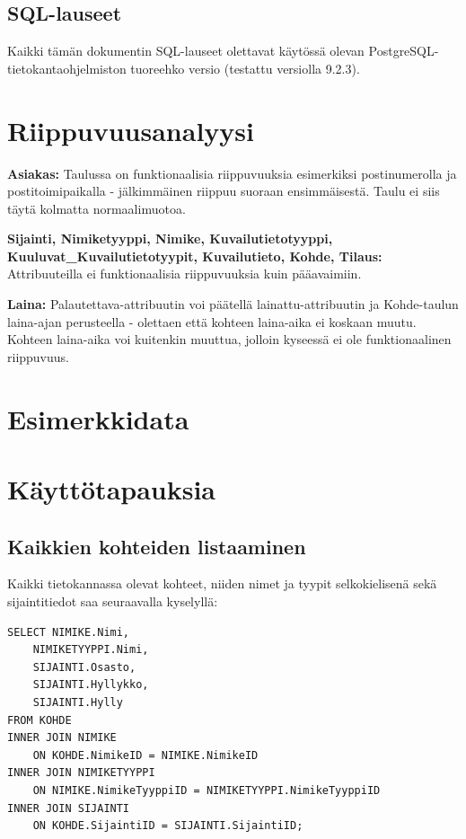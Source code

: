 \documentclass{article}
\let\stdsection\section
\renewcommand\section{\newpage\stdsection}
\begin{document}
\subsection{SQL-lauseet}

Kaikki tämän dokumentin SQL-lauseet olettavat käytössä olevan PostgreSQL-tietokantaohjelmiston tuoreehko versio (testattu versiolla 9.2.3).



\section{Riippuvuusanalyysi}

\textbf{Asiakas:} Taulussa on funktionaalisia riippuvuuksia esimerkiksi postinumerolla ja postitoimipaikalla - jälkimmäinen riippuu suoraan ensimmäisestä. Taulu ei siis täytä kolmatta normaalimuotoa.

\textbf{Sijainti, Nimiketyyppi, Nimike, Kuvailutietotyyppi, Kuuluvat\_\-Kuvailutietotyypit, Kuvailutieto, Kohde, Tilaus:} Attribuuteilla ei funktionaalisia riippuvuuksia kuin pääavaimiin.

\textbf{Laina:} Palautettava-attribuutin voi päätellä lainattu-attribuutin ja Kohde-taulun laina-ajan perusteella - olettaen että kohteen laina-aika ei koskaan muutu. Kohteen laina-aika voi kuitenkin muuttua, jolloin kyseessä ei ole funktionaalinen riippuvuus.

\section{Esimerkkidata}



\section{Käyttötapauksia}

\subsection{Kaikkien kohteiden listaaminen}

Kaikki tietokannassa olevat kohteet, niiden nimet ja tyypit selkokielisenä sekä sijaintitiedot saa seuraavalla kyselyllä:

\begin{lstlisting}
SELECT NIMIKE.Nimi,
    NIMIKETYYPPI.Nimi,
    SIJAINTI.Osasto,
    SIJAINTI.Hyllykko,
    SIJAINTI.Hylly
FROM KOHDE
INNER JOIN NIMIKE
    ON KOHDE.NimikeID = NIMIKE.NimikeID
INNER JOIN NIMIKETYYPPI
    ON NIMIKE.NimikeTyyppiID = NIMIKETYYPPI.NimikeTyyppiID
INNER JOIN SIJAINTI
    ON KOHDE.SijaintiID = SIJAINTI.SijaintiID;
\end{lstlisting}
\end{document}
